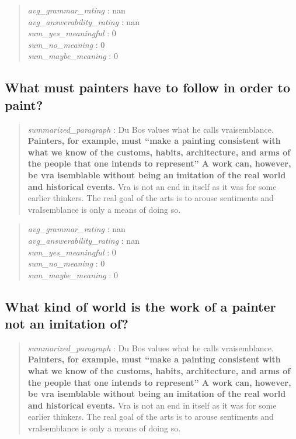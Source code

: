 \begin{quote}
\emph{avg\_grammar\_rating} : nan\\
\emph{avg\_answerability\_rating} : nan\\
\emph{sum\_yes\_meaningful} : 0\\
\emph{sum\_no\_meaning} : 0\\
\emph{sum\_maybe\_meaning} : 0
\end{quote}

\hypertarget{what-must-painters-have-to-follow-in-order-to-paint}{%
\subsection{What must painters have to follow in order to
paint?}\label{what-must-painters-have-to-follow-in-order-to-paint}}

\begin{quote}
\emph{summarized\_paragraph} : Du Bos values what he calls
vraisemblance. \textbf{Painters, for example, must ``make a painting
consistent with what we know of the customs, habits, architecture, and
arms of the people that one intends to represent'' A work can, however,
be vra isemblable without being an imitation of the real world and
historical events.} Vra is not an end in itself as it was for some
earlier thinkers. The real goal of the arts is to arouse sentiments and
vraIsemblance is only a means of doing so.
\end{quote}

\begin{quote}
\emph{avg\_grammar\_rating} : nan\\
\emph{avg\_answerability\_rating} : nan\\
\emph{sum\_yes\_meaningful} : 0\\
\emph{sum\_no\_meaning} : 0\\
\emph{sum\_maybe\_meaning} : 0
\end{quote}

\hypertarget{what-kind-of-world-is-the-work-of-a-painter-not-an-imitation-of}{%
\subsection{What kind of world is the work of a painter not an imitation
of?}\label{what-kind-of-world-is-the-work-of-a-painter-not-an-imitation-of}}

\begin{quote}
\emph{summarized\_paragraph} : Du Bos values what he calls
vraisemblance. \textbf{Painters, for example, must ``make a painting
consistent with what we know of the customs, habits, architecture, and
arms of the people that one intends to represent'' A work can, however,
be vra isemblable without being an imitation of the real world and
historical events.} Vra is not an end in itself as it was for some
earlier thinkers. The real goal of the arts is to arouse sentiments and
vraIsemblance is only a means of doing so.
\end{quote}

